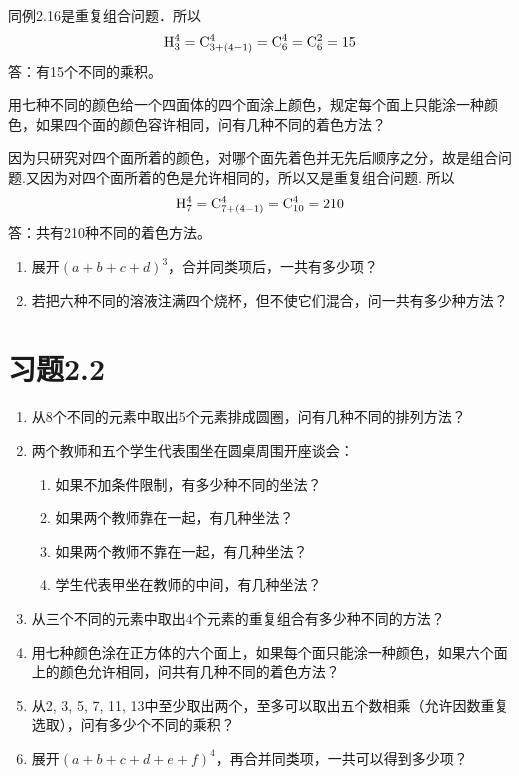 \begin{solution}
    同例2.16是重复组合问题．所以
    \[{\rm H}^4_3={\rm C}^{4}_{3+(4-1)}={\rm C}^{4}_{6}={\rm C}^{2}_{6}=15\]
答：有15个不同的乘积。
\end{solution}

\begin{example}
    用七种不同的颜色给一个四面体的四个面涂上颜色，规定每个面上只能涂一种颜色，如果四个面的颜色容许相同，问有几种不同的着色方法？
\end{example}

\begin{solution}
    因为只研究对四个面所着的颜色，对哪个面先着色并无先后顺序之分，故是组合问题.又因为对四个面所着的色是允许相同的，所以又是重复组合问题. 所以
    \[{\rm H}^4_7={\rm C}^{4}_{7+(4-1)}={\rm C}^{4}_{10}=210\]
    答：共有210种不同的着色方法。
\end{solution}


\begin{ex}
\begin{enumerate}
\item 展开$(a+b+c+d)^3$，合并同类项后，一共有多少项？
\item 若把六种不同的溶液注满四个烧杯，但不使它们混合，问一共有多少种方法？
\end{enumerate}
\end{ex}

\section*{习题2.2}
\begin{enumerate}
\item 从8个不同的元素中取出5个元素排成圆圈，问有几种不同的排列方法？
\item 两个教师和五个学生代表围坐在圆桌周围开座谈会：
\begin{enumerate}[(1)]
\item 如果不加条件限制，有多少种不同的坐法？
\item 如果两个教师靠在一起，有几种坐法？
\item 如果两个教师不靠在一起，有几种坐法？
\item 学生代表甲坐在教师的中间，有几种坐法？
\end{enumerate}
\item 从三个不同的元素中取出4个元素的重复组合有多少种不同的方法？
\item 用七种颜色涂在正方体的六个面上，如果每个面只能涂一种颜色，如果六个面上的颜色允许相同，问共有几种不同的着色方法？
\item 从2, 3, 5, 7, 11, 13中至少取出两个，至多可以取出五个数相乘（允许因数重复选取），问有多少个不同的乘积？
\item 展开$(a+b+c+d+e+f)^4$，再合并同类项，一共可以得到多少项？
\end{enumerate}

